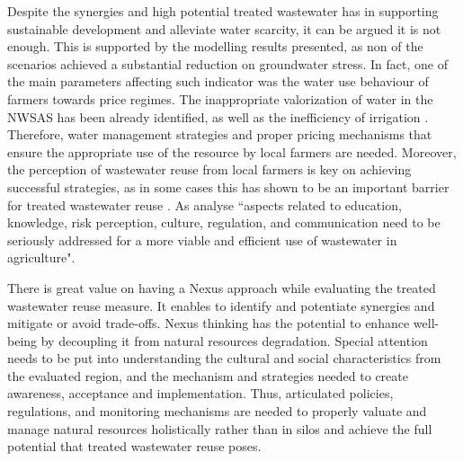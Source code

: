 Despite the synergies and high potential treated wastewater has in supporting sustainable development and alleviate water scarcity, it can be argued it is not enough. This is supported by the modelling results presented, as non of the scenarios achieved a substantial reduction on groundwater stress. In fact, one of the main parameters affecting such indicator was the water use behaviour of farmers towards price regimes. The inappropriate valorization of water in the NWSAS has been already identified, as well as the inefficiency of irrigation \cite{BetterValorizationIrrigation2015}. Therefore, water management strategies and proper pricing mechanisms that ensure the appropriate use of the resource by local farmers are needed. Moreover, the perception of wastewater reuse from local farmers is key on achieving successful strategies, as in some cases this has shown to be an important barrier for treated wastewater reuse \cite{mahjoubPublicAcceptanceWastewater2018}. As \citet{mahjoubPublicAcceptanceWastewater2018} analyse ``aspects related to education, knowledge, risk perception, culture, regulation, and communication need to be seriously addressed for a more viable and efficient use of wastewater in agriculture".

There is great value on having a Nexus approach while evaluating the treated wastewater reuse measure. It enables to identify and potentiate synergies and mitigate or avoid trade-offs. Nexus thinking has the potential to enhance well-being by decoupling it from natural resources degradation. Special attention needs to be put into understanding the cultural and social characteristics from the evaluated region, and the mechanism and strategies needed to create awareness, acceptance and implementation. Thus, articulated policies, regulations, and monitoring mechanisms are needed to properly valuate and manage natural resources holistically rather than in silos and achieve the full potential that treated wastewater reuse poses.